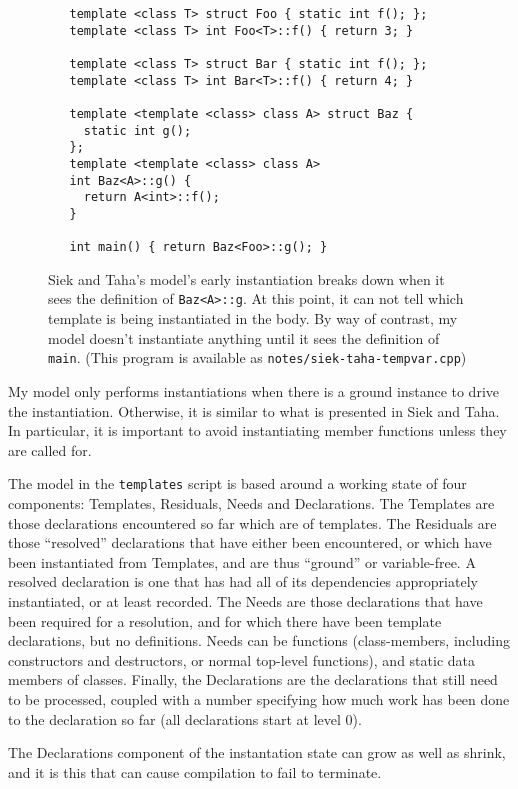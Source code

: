 \documentclass[11pt]{article}
\begin{document}
\begin{figure}
\begin{verbatim}
   template <class T> struct Foo { static int f(); };
   template <class T> int Foo<T>::f() { return 3; }

   template <class T> struct Bar { static int f(); };
   template <class T> int Bar<T>::f() { return 4; }

   template <template <class> class A> struct Baz {
     static int g();
   };
   template <template <class> class A>
   int Baz<A>::g() {
     return A<int>::f();
   }

   int main() { return Baz<Foo>::g(); }
\end{verbatim}
  \caption{Siek and Taha's model's early instantiation breaks down
    when it sees the definition of \texttt{Baz<A>::g}.  At this point,
    it can not tell which template is being instantiated in the body.
    By way of contrast, my model doesn't instantiate anything until it
    sees the definition of \texttt{main}.
    (This program is available as
    \texttt{notes/siek-taha-tempvar.cpp})}
\label{fig:taha-problem}
\end{figure}

My model only performs instantiations when there is a ground instance
to drive the instantiation.  Otherwise, it is similar to what is
presented in Siek and Taha.  In particular, it is important to avoid
instantiating member functions unless they are called for.

The model in the \texttt{templates} script is based around a working
state of four components: Templates, Residuals, Needs and
Declarations.  The Templates are those declarations encountered so far
which are of templates.  The Residuals are those ``resolved''
declarations that have either been encountered, or which have been
instantiated from Templates, and are thus ``ground'' or variable-free.
A resolved declaration is one that has had all of its dependencies
appropriately instantiated, or at least recorded.  The Needs are those
declarations that have been required for a resolution, and for which
there have been template declarations, but no definitions.  Needs can
be functions (class-members, including constructors and destructors,
or normal top-level functions), and static data members of classes.
Finally, the Declarations are the declarations that still need to be
processed, coupled with a number specifying how much work has been
done to the declaration so far (all declarations start at level 0).

The Declarations component of the instantation state can grow as well
as shrink, and it is this that can cause compilation to fail to
terminate.
\end{document}
